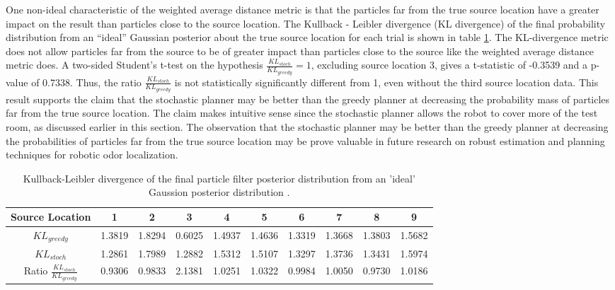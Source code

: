 \documentclass[submit, 12pt]{aiaa-pretty-modified}
\begin{document}
One non-ideal characteristic of the weighted average distance metric
is that the particles far from the true source location have a greater
impact on the result than particles close to the source location.
The Kullback - Leibler divergence (KL divergence) of the final
probability distribution from an ``ideal'' Gaussian posterior about
the true source location for each trial is shown in table
\ref{tab:kl-ideal}.  The KL-divergence metric does not allow particles far from
the source to be of greater impact than particles close to the source
like the weighted average distance metric does.  A
two-sided Student's t-test on the hypothesis
$\frac{KL_{stoch}}{KL_{greedy}} = 1$, excluding source location 3, gives a t-statistic of -0.3539 and
a p-value of 0.7338.  Thus, the ratio $\frac{KL_{stoch}}{KL_{greedy}}$
is not statistically significantly different from 1, even without the
third source location data.  This result supports the claim that the
stochastic planner may be better than the greedy planner at decreasing the probability mass of
particles far from the true source location.  The claim makes
intuitive sense since the stochastic planner allows the robot to cover
more of the test room, as discussed earlier in this section.  The
observation that the stochastic planner may be better than the greedy
planner at decreasing the probabilities of particles far from the true
source location may be prove valuable in future research on robust
estimation and planning techniques for robotic odor localization.


\begin{table}[htb]
\begin{center}
\begin{tabular}{|c||c||c||c||c||c||c||c||c||c|}
\hline
 Source Location & 1 & 2 & 3 & 4 & 5 & 6 & 7 & 8 & 9 \\
\hline \hline
$KL_{greedy}$ & 1.3819 & 1.8294 & 0.6025 & 1.4937 & 1.4636 & 1.3319 & 1.3668 & 1.3803 & 1.5682 \\
\hline
$KL_{stoch}$  & 1.2861 & 1.7989 & 1.2882 & 1.5312 & 1.5107 & 1.3297 & 1.3736 & 1.3431 & 1.5974 \\
\hline
Ratio $\frac{KL_{stoch}}{KL_{greedy}}$ & 0.9306 & 0.9833 & 2.1381 & 1.0251 & 1.0322 & 0.9984 & 1.0050 & 0.9730 & 1.0186 \\
\hline
\end{tabular}
\caption{Kullback-Leibler divergence of the final particle filter
  posterior distribution from an 'ideal' Gaussion posterior distribution . }
\label{tab:kl-ideal}
\end{center}
\end{table}
\end{document}
